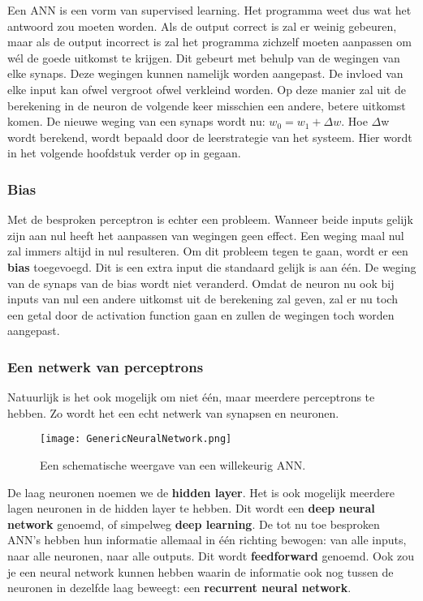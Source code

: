 Een ANN is een vorm van supervised learning. Het programma weet dus wat het antwoord zou moeten worden. Als de output correct is zal er weinig gebeuren, maar als de output incorrect is zal het programma zichzelf moeten aanpassen om w\'el de goede uitkomst te krijgen. Dit gebeurt met behulp van de wegingen van elke synaps. Deze wegingen kunnen namelijk worden aangepast. De invloed van elke input kan ofwel vergroot ofwel verkleind worden. Op deze manier zal uit de berekening in de neuron de volgende keer misschien een andere, betere uitkomst komen. De nieuwe weging van een synaps wordt nu: $ w_{0} = w_{1} + \Delta w $.
Hoe $ \Delta $w wordt berekend, wordt bepaald door de leerstrategie van het systeem. Hier wordt in het volgende hoofdstuk verder op in gegaan.

\subsubsection{Bias}
Met de besproken perceptron is echter een probleem. Wanneer beide inputs gelijk zijn aan nul heeft het aanpassen van wegingen geen effect. Een weging maal nul zal immers altijd in nul resulteren. Om dit probleem tegen te gaan, wordt er een \textbf{bias} toegevoegd. Dit is een extra input die standaard gelijk is aan \'{e}\'{e}n. De weging van de synaps van de bias wordt niet veranderd. Omdat de neuron nu ook bij inputs van nul een andere uitkomst uit de berekening zal geven, zal er nu toch een getal door de activation function gaan en zullen de wegingen toch worden aangepast. 

\subsubsection{Een netwerk van perceptrons}
Natuurlijk is het ook mogelijk om niet \'{e}\'{e}n, maar meerdere perceptrons te hebben. Zo wordt het een echt netwerk van synapsen en neuronen.

\begin{figure}[h]
  \centering
    \texttt{[image: GenericNeuralNetwork.png]}
  \caption{Een schematische weergave van een willekeurig ANN.}
  \label{fig:ANN}
\end{figure}

De laag neuronen noemen we de \textbf{hidden layer}. Het is ook mogelijk meerdere lagen neuronen in de hidden layer te hebben. Dit wordt een \textbf{deep neural network} genoemd, of simpelweg \textbf{deep learning}.
De tot nu toe besproken ANN’s hebben hun informatie allemaal in \'{e}\'{e}n richting bewogen: van alle inputs, naar alle neuronen, naar alle outputs. Dit wordt \textbf{feedforward} genoemd. Ook zou je een neural network kunnen hebben waarin de informatie ook nog tussen de neuronen in dezelfde laag beweegt: een \textbf{recurrent neural network}.

